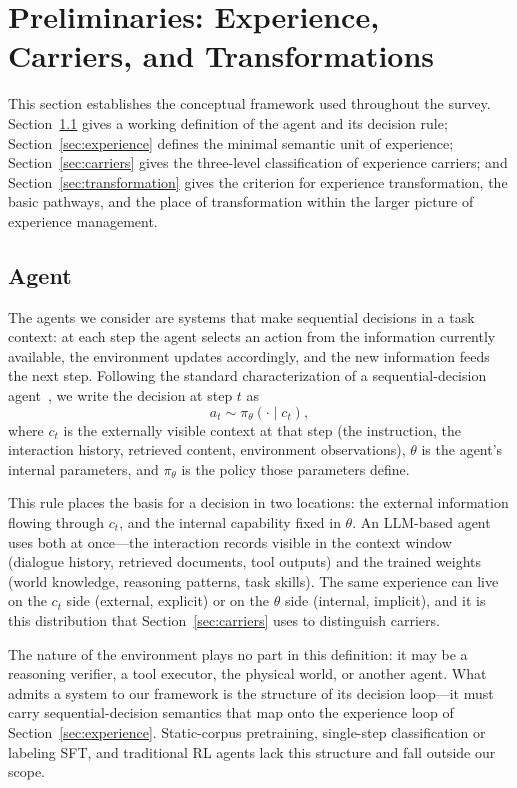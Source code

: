 \section{Preliminaries: Experience, Carriers, and Transformations}
\label{sec:prelim}

This section establishes the conceptual framework used throughout the survey. Section~\ref{sec:agent} gives a working definition of the agent and its decision rule; Section~\ref{sec:experience} defines the minimal semantic unit of experience; Section~\ref{sec:carriers} gives the three-level classification of experience carriers; and Section~\ref{sec:transformation} gives the criterion for experience transformation, the basic pathways, and the place of transformation within the larger picture of experience management.

\subsection{Agent}
\label{sec:agent}

The agents we consider are systems that make sequential decisions in a task context: at each step the agent selects an action from the information currently available, the environment updates accordingly, and the new information feeds the next step. Following the standard characterization of a sequential-decision agent~\cite{RussellNorvig2021}, we write the decision at step $t$ as
\[
  a_t \sim \pi_\theta(\cdot \mid c_t),
\]
where $c_t$ is the externally visible context at that step (the instruction, the interaction history, retrieved content, environment observations), $\theta$ is the agent's internal parameters, and $\pi_\theta$ is the policy those parameters define.

This rule places the basis for a decision in two locations: the external information flowing through $c_t$, and the internal capability fixed in $\theta$. An LLM-based agent uses both at once---the interaction records visible in the context window (dialogue history, retrieved documents, tool outputs) and the trained weights (world knowledge, reasoning patterns, task skills). The same experience can live on the $c_t$ side (external, explicit) or on the $\theta$ side (internal, implicit), and it is this distribution that Section~\ref{sec:carriers} uses to distinguish carriers.

The nature of the environment plays no part in this definition: it may be a reasoning verifier, a tool executor, the physical world, or another agent. What admits a system to our framework is the structure of its decision loop---it must carry sequential-decision semantics that map onto the experience loop of Section~\ref{sec:experience}. Static-corpus pretraining, single-step classification or labeling SFT, and traditional RL agents lack this structure and fall outside our scope.

